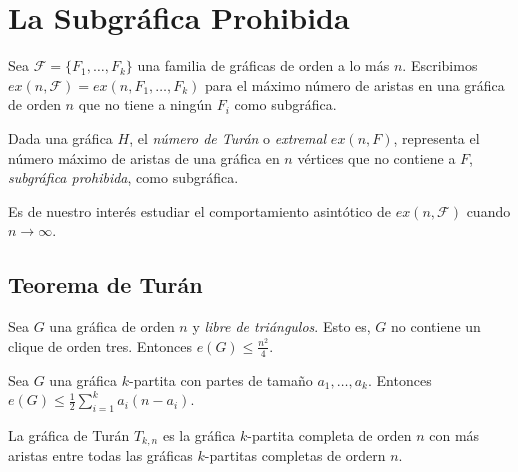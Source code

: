 
\section{La Subgráfica Prohibida}

\begin{definition} Sea $\mathcal F = \{F_1,
  \ldots, F_k\}$ una familia de gráficas de orden a lo más $n$. Escribimos
  $ex(n, \mathcal F) = ex(n, F_1, \ldots, F_k)$ para el máximo número de aristas
  en una gráfica de orden $n$ que no tiene a ningún $F_i$ como subgráfica.
\end{definition}

\begin{definition}
  Dada una gráfica $H$, el \textit{número de Turán} o \textit{extremal}
  $ex(n, F)$, representa el número máximo de aristas de una gráfica en
  $n$ vértices que no contiene a $F$, \textit{subgráfica prohibida},
  como subgráfica.
\end{definition}

Es de nuestro interés estudiar el comportamiento asintótico de $ex(n,
\mathcal F)$ cuando $n \to \infty$.

\subsection{Teorema de Turán}

\begin{theorem}[Mantel]
  Sea $G$ una gráfica de orden $n$ y \textit{libre de triángulos}.
  Esto es, $G$ no
  contiene un clique de orden tres. Entonces $e(G) \leq \frac{n^2}{4}$.
\end{theorem}

\begin{theorem}
  Sea $G$ una gráfica $k$-partita con partes de tamaño $a_1, \ldots,
  a_k$. Entonces
  $e(G) \le \frac{1}{2} \sum_{i=1}^k a_i (n - a_i)$.
\end{theorem}

\begin{corollary}
  La gráfica de Turán $T_{k, n}$ es la gráfica $k$-partita completa
  de orden $n$ con más aristas entre todas las gráficas $k$-partitas
  completas de ordern $n$.
\end{corollary}


